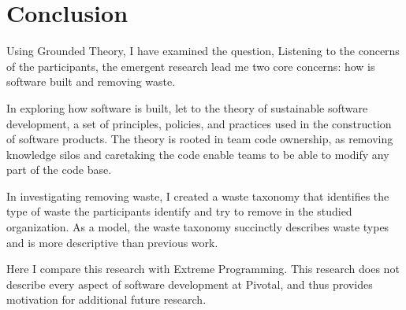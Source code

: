 
\chapter{Conclusion}
\label{ConclusionChapter}

Using Grounded Theory, I have examined the question,  Listening to the concerns of the participants, the emergent research lead me two core concerns: how is software built and removing waste. 
 
In exploring how software is built, let to the theory of sustainable software development, a set of principles, policies, and practices used in the construction of software products. The theory is rooted in team code ownership, as removing knowledge silos and caretaking the code enable teams to be able to modify any part of the code base. 

In investigating removing waste, I created a waste taxonomy that identifies the type of waste the participants identify and try to remove in the studied organization. As a model, the waste taxonomy succinctly describes waste types and  is more descriptive than previous work. 

Here I compare this research with Extreme Programming. This research does not describe every aspect of software development at Pivotal, and thus provides motivation for additional future research. 